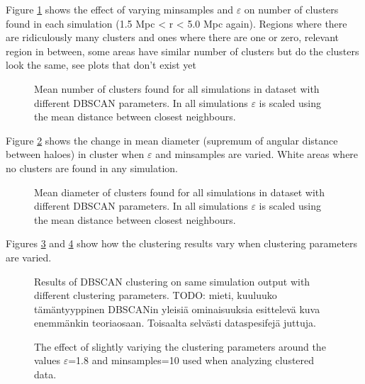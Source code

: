 \documentclass[english, oneside]{HYgradu}
\begin{document}
Figure \ref{fig:clusteringparameters} shows the effect of varying minsamples and $\varepsilon$ on number of clusters found in each simulation (1.5 Mpc < r < 5.0 Mpc again). Regions where there are ridiculously many clusters and ones where there are one or zero, relevant region in between, some areas have similar number of clusters but do the clusters look the same, see plots that don't exist yet

\begin{figure}
    \centering
    
    \caption{Mean number of clusters found for all simulations in dataset with different DBSCAN parameters. In all simulations $\varepsilon$ is scaled using the mean distance between closest neighbours.}\label{fig:clusteringparameters}
\end{figure}

\reversemarginpar
{}
Figure \ref{fig:clusterdiameter} shows the change in mean diameter (supremum of angular distance between haloes) in cluster when $\varepsilon$ and minsamples are varied. White areas where no clusters are found in any simulation.

\begin{figure}
    \centering
    
    \caption{Mean diameter of clusters found for all simulations in dataset with different DBSCAN parameters. In all simulations $\varepsilon$ is scaled using the mean distance between closest neighbours.}\label{fig:clusterdiameter}
\end{figure}

\reversemarginpar
{}
Figures \ref{fig:clusteringExamples} and \ref{fig:clusteringvariations} show how the clustering results vary when clustering parameters are varied.

\begin{figure}
    \centering
    
    \caption{Results of DBSCAN clustering on same simulation output with different clustering parameters. TODO: mieti, kuuluuko tämäntyyppinen DBSCANin yleisiä ominaisuuksia esittelevä kuva enemmänkin teoriaosaan. Toisaalta selvästi dataspesifejä juttuja.}\label{fig:clusteringExamples}
\end{figure}

\begin{figure}
    \centering
    
    \caption{The effect of slightly variying the clustering parameters around the values $\varepsilon$=1.8 and minsamples=10 used when analyzing clustered data.}\label{fig:clusteringvariations}
\end{figure}
\end{document}
